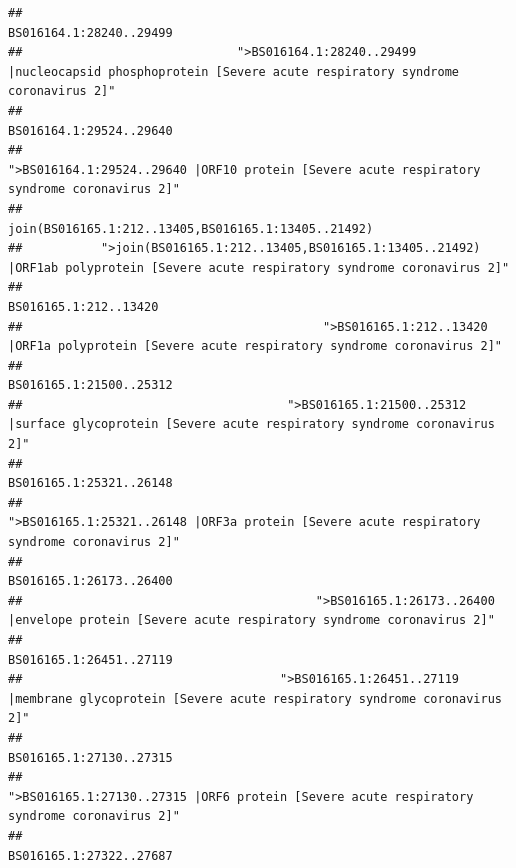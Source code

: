 \documentclass[
]{article}
\begin{document}
\begin{verbatim}
##                                                                                                                BS016164.1:28240..29499 
##                              ">BS016164.1:28240..29499 |nucleocapsid phosphoprotein [Severe acute respiratory syndrome coronavirus 2]" 
##                                                                                                                BS016164.1:29524..29640 
##                                            ">BS016164.1:29524..29640 |ORF10 protein [Severe acute respiratory syndrome coronavirus 2]" 
##                                                                                    join(BS016165.1:212..13405,BS016165.1:13405..21492) 
##           ">join(BS016165.1:212..13405,BS016165.1:13405..21492) |ORF1ab polyprotein [Severe acute respiratory syndrome coronavirus 2]" 
##                                                                                                                  BS016165.1:212..13420 
##                                          ">BS016165.1:212..13420 |ORF1a polyprotein [Severe acute respiratory syndrome coronavirus 2]" 
##                                                                                                                BS016165.1:21500..25312 
##                                     ">BS016165.1:21500..25312 |surface glycoprotein [Severe acute respiratory syndrome coronavirus 2]" 
##                                                                                                                BS016165.1:25321..26148 
##                                            ">BS016165.1:25321..26148 |ORF3a protein [Severe acute respiratory syndrome coronavirus 2]" 
##                                                                                                                BS016165.1:26173..26400 
##                                         ">BS016165.1:26173..26400 |envelope protein [Severe acute respiratory syndrome coronavirus 2]" 
##                                                                                                                BS016165.1:26451..27119 
##                                    ">BS016165.1:26451..27119 |membrane glycoprotein [Severe acute respiratory syndrome coronavirus 2]" 
##                                                                                                                BS016165.1:27130..27315 
##                                             ">BS016165.1:27130..27315 |ORF6 protein [Severe acute respiratory syndrome coronavirus 2]" 
##                                                                                                                BS016165.1:27322..27687 

\end{verbatim}
\end{document}
